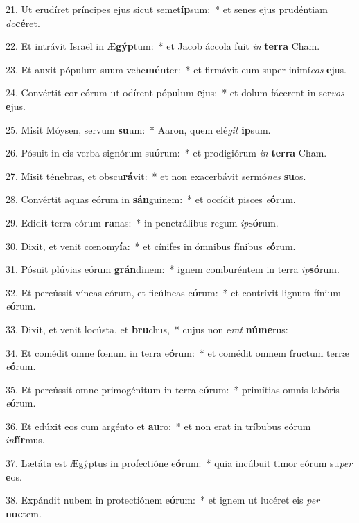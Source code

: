 21. Ut erudíret príncipes ejus sicut semet\textbf{íp}sum:~*  et senes ejus prudéntiam \textit{do}\textbf{cé}ret.\

22. Et intrávit Israël in Æ\textbf{gýp}tum:~*  et Jacob áccola fuit \textit{in} \textbf{ter}\textbf{ra} Cham.\

23. Et auxit pópulum suum vehe\textbf{mén}ter:~*  et firmávit eum super inimí\textit{cos} \textbf{e}jus.\

24. Convértit cor eórum ut odírent pópulum \textbf{e}jus:~*  et dolum fácerent in ser\textit{vos} \textbf{e}jus.\

25. Misit Móysen, servum \textbf{su}um:~*  Aaron, quem elé\textit{git} \textbf{ip}sum.\

26. Pósuit in eis verba signórum su\textbf{ó}rum:~*  et prodigiórum \textit{in} \textbf{ter}\textbf{ra} Cham.\

27. Misit ténebras, et obscu\textbf{rá}vit:~*  et non exacerbávit sermó\textit{nes} \textbf{su}os.\

28. Convértit aquas eórum in \textbf{sán}guinem:~*  et occídit pisces \textit{e}\textbf{ó}rum.\

29. Edidit terra eórum \textbf{ra}nas:~*  in penetrálibus regum \textit{ip}\textbf{só}rum.\

30. Dixit, et venit cœnomy\textbf{í}a:~*  et cínifes in ómnibus fínibus \textit{e}\textbf{ó}rum.\

31. Pósuit plúvias eórum \textbf{grán}dinem:~*  ignem comburéntem in terra \textit{ip}\textbf{só}rum.\

32. Et percússit víneas eórum, et ficúlneas e\textbf{ó}rum:~*  et contrívit lignum fínium \textit{e}\textbf{ó}rum.\

33. Dixit, et venit locústa, et \textbf{bru}chus,~*  cujus non e\textit{rat} \textbf{nú}\textbf{me}rus:\

34. Et comédit omne fœnum in terra e\textbf{ó}rum:~*  et comédit omnem fructum terræ \textit{e}\textbf{ó}rum.\

35. Et percússit omne primogénitum in terra e\textbf{ó}rum:~*  primítias omnis labóris \textit{e}\textbf{ó}rum.\

36. Et edúxit eos cum argénto et \textbf{au}ro:~*  et non erat in tríbubus eórum \textit{in}\textbf{fír}mus.\

37. Lætáta est Ægýptus in profectióne e\textbf{ó}rum:~*  quia incúbuit timor eórum su\textit{per} \textbf{e}os.\

38. Expándit nubem in protectiónem e\textbf{ó}rum:~*  et ignem ut lucéret eis \textit{per} \textbf{noc}tem.\

